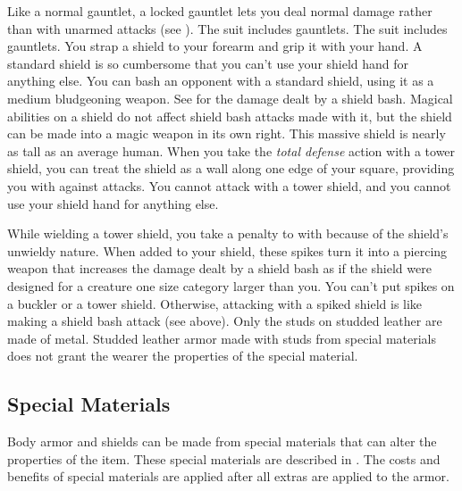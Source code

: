         Like a normal gauntlet, a locked gauntlet lets you deal normal damage rather than  with unarmed attacks (see ).
         The suit includes gauntlets.
         The suit includes gauntlets.
         You strap a shield to your forearm and grip it with your hand. A standard shield is so cumbersome that you can't use your shield hand for anything else.
         You can bash an opponent with a standard shield, using it as a medium bludgeoning weapon. See  for the damage dealt by a shield bash.
        Magical abilities on a shield do not affect shield bash attacks made with it, but the shield can be made into a magic weapon in its own right.
         This massive shield is nearly as tall as an average human.
        When you take the \textit{total defense} action with a tower shield, you can treat the shield as a wall along one edge of your square, providing you with  against attacks.
        You cannot attack with a tower shield, and you cannot use your shield hand for anything else.

        While wielding a tower shield, you take a  penalty to  with  because of the shield's unwieldy nature.
         When added to your shield, these spikes turn it into a piercing weapon that increases the damage dealt by a shield bash as if the shield were designed for a creature one size category larger than you. You can't put spikes on a buckler or a tower shield. Otherwise, attacking with a spiked shield is like making a shield bash attack (see above).
         Only the studs on studded leather are made of metal.
        Studded leather armor made with studs from special materials does not grant the wearer the properties of the special material.

    \subsection{Special Materials}\label{Special Materials}
        Body armor and shields can be made from special materials that can alter the properties of the item.
        These special materials are described in .
        The costs and benefits of special materials are applied after all extras are applied to the armor.

